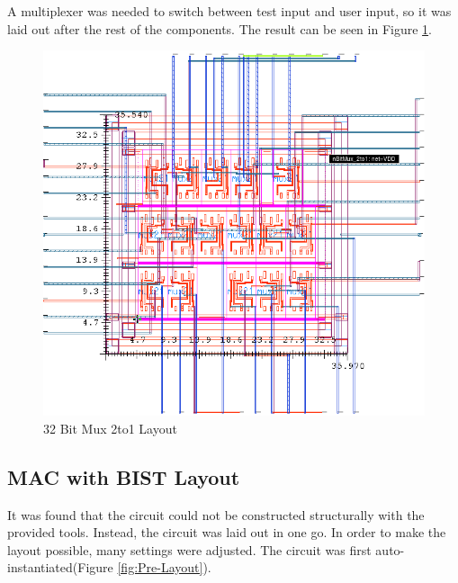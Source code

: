 \documentclass[11pt]{article}
\begin{document}
		A multiplexer was needed to switch between test input and user input, so it was laid out after the rest of the components. The result can be seen in Figure \ref{fig:nBitMux-2to1-Layout}.

		\begin{figure}[H] 
			\centering 
			\includegraphics[width=\textwidth,height=\dimexpr\textheight-4\baselineskip-\abovecaptionskip-\belowcaptionskip\relax,keepaspectratio]{"Pictures/nBitMux_2to1 Layout"}
			\caption{32 Bit Mux 2to1 Layout} 
			\label{fig:nBitMux-2to1-Layout} 
		\end{figure}
	
		
	\subsection{MAC with BIST Layout}
	
		It was found that the circuit could not be constructed structurally with the provided tools. Instead, the circuit was laid out in one go. In order to make the layout possible, many settings were adjusted. The circuit was first auto-instantiated(Figure \ref{fig:Pre-Layout}). 
	
\end{document}
